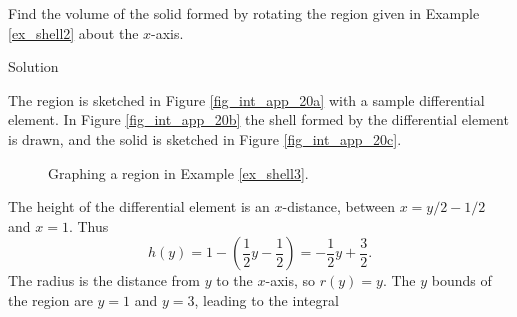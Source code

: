 \begin{example}\label{ex_shell3}

Find the volume of the solid formed by rotating the region given in Example \ref{ex_shell2} about the $x$-axis.

Solution 

The region is sketched in Figure \ref{fig_int_app_20a} with a sample differential element. In Figure \ref{fig_int_app_20b} the shell formed by the differential element is drawn, and the solid is sketched in Figure \ref{fig_int_app_20c}. 


\begin{figure}[H]
\centering
\qquad
{}
\qquad
{}
\caption{Graphing a region in Example \ref{ex_shell3}.}
\end{figure}


The height of the differential element is an $x$-distance, between $x=y/2-1/2$ and $x=1$. Thus $$h(y) = 1-\left(\frac12y-\frac12\right) = -\frac12y+\frac32.$$ The radius is the distance from $y$ to the $x$-axis, so $r(y) =y$. The $y$ bounds of the region are $y=1$ and $y=3$, leading to the integral


\end{example}
